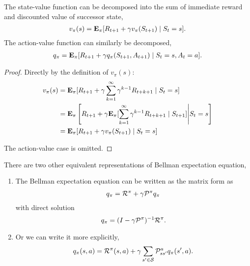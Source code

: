 \begin{theorem}\label{bellman_equation}
	The state-value function can be decomposed into the sum of immediate
	reward and discounted value of successor state,
	\begin{align*}
		v_\pi(s) = \mathbf{E}_\pi [ R_{t+1} + \gamma v_\pi(S_{t+1}) \mid S_t = s ].
	\end{align*}
	The action-value function can similarly be decomposed,
	\begin{align*}
		q_\pi = \mathbf{E}_\pi [R_{t+1} + \gamma q_\pi(S_{t+1}, A_{t+1}) \mid S_t = s, A_t = a].
	\end{align*}
\end{theorem}
\begin{proof}
	Directly by the definition of $v_\pi(s)$:
	\begin{align*}
		v_\pi(s) &= \mathbf{E}_\pi  [  R_{t+1} + \gamma \sum_{k=1}^\infty \gamma^{k-1} R_{t+k+1} \mid  S_t = s  ] \\
		&= \mathbf{E}_\pi\left[  R_{t+1} + \gamma  \mathbf{E}_\pi[\sum_{k=1}^\infty \gamma^{k-1} R_{t+k+1} \mid S_{t+1} ]  \Bigg| S_t = s \right]\\
		&= \mathbf{E}_\pi [  R_{t+1} + \gamma  v_\pi(S_{t+1})  \mid S_t = s  ]
	\end{align*}
	
	The action-value case is omitted.
\end{proof}
\begin{remark}There are two other equivalent representations of Bellman expectation equation,
	\begin{enumerate}[1)]
		\item 
		The Bellman expectation equation can be written as the matrix form as
		\begin{align*}
		q_\pi = \mathcal{R}^\pi + \gamma \mathcal{P}^\pi q_\pi
		\end{align*}
		with direct solution
		\begin{align*}
		q_\pi = (I - \gamma \mathcal{P}^\pi)^{-1} \mathcal{R}^\pi.
		\end{align*}  
		
		\item 
		Or we can write it more explicitly,
		\begin{align*}
		  q_\pi(s,a) =  \mathcal{R}^\pi (s, a  ) + \gamma \sum_{s'\in\mathcal{S}} \mathcal{P}^{a  }_{ss'} q_\pi(s',a).
		\end{align*}
		
	\end{enumerate}
	
\end{remark}


